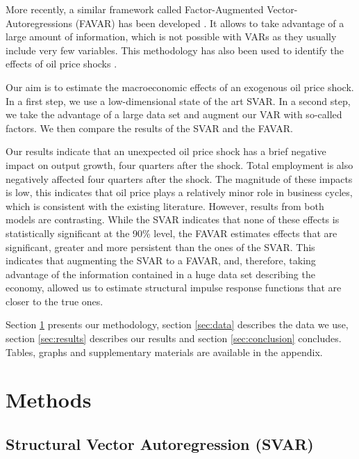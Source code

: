 \documentclass[11pt,a4paper]{article}
\begin{document}
More recently, a similar framework called Factor-Augmented Vector-Autoregressions (FAVAR)  has been developed \citep{bernanke2005factor}. 
It allows to take advantage of a large amount of information, which is not possible with VARs as they usually include very few variables. This methodology has also been used to identify the effects of oil price shocks \citep{aastveit2014oil, aastveit2015drives}.   

Our aim is to estimate the macroeconomic effects of an exogenous oil price shock. In a first step, we use a low-dimensional state of the art SVAR. 
In a second step, we take the advantage of a large data set and augment our VAR with so-called factors. 
We then compare the results of the SVAR and the FAVAR.

Our results indicate that an unexpected oil price shock has a brief negative impact on output growth,  four quarters after the shock. Total employment is also negatively affected four quarters after the shock. The magnitude of these impacts is low, this indicates that oil price plays a relatively minor role in business cycles, which is consistent with the existing literature.
However, results from both models are contrasting. While the SVAR indicates that none of these effects is statistically significant at the 90\% level, the FAVAR estimates effects that are significant, greater and more persistent than the ones of the SVAR. This indicates that augmenting the SVAR to a FAVAR, and, therefore, taking advantage of the information contained in a huge data set describing the economy, allowed us to estimate structural impulse response functions that are closer to the true ones. 

Section \ref{sec:method} presents our methodology, section \ref{sec:data} describes the data we use, section \ref{sec:results} describes our results and section \ref{sec:conclusion} concludes. Tables, graphs and supplementary materials are available in the appendix. 





\section{Methods}
\label{sec:method}

\subsection{Structural Vector Autoregression (SVAR)}
\end{document}
